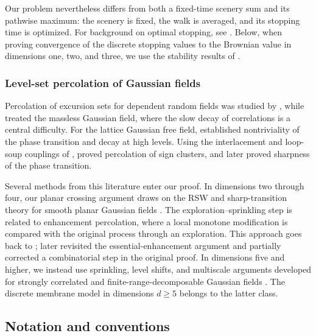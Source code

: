 \documentclass[11pt]{amsart}
\theoremstyle{plain}
\theoremstyle{definition}
\begin{document}
Our problem nevertheless differs from both a fixed-time scenery sum and its
pathwise maximum: the scenery is fixed, the walk is averaged, and its stopping
time is optimized. For background on optimal stopping, see \citet*{PeskirShiryaev}. Below, when proving convergence of
the discrete stopping values to the Brownian value in dimensions one, two, and three, we use the stability results of \citet*[Theorem~3 and Corollary~4]{CoquetToldo}.

\subsubsection{Level-set percolation of Gaussian fields}

Percolation of excursion sets for dependent random fields was studied by
\citet*{MolStepI}, while \citet*{BLM} treated the massless Gaussian field,
where the slow decay of correlations is a central difficulty. For the
lattice Gaussian free field, \citet*{RodSzn} established nontriviality of the
phase transition and decay at high levels. Using the interlacement and
loop-soup couplings of \citet*{Lupu}, \citet*{DPR} proved percolation of sign
clusters, and \citet*{DGRS} later proved sharpness of the phase transition.

Several methods from this literature enter our proof. In dimensions two through four, our planar crossing argument draws on the RSW
and sharp-transition theory for smooth planar Gaussian fields
\citep{BeffaraGayet,MuiVan}. The exploration--sprinkling step is related to enhancement percolation, where a local monotone modification is compared with the original process through an exploration. This approach goes back to
\citet*{AizenmanGrimmett}; \citet*{BalisterBollobasRiordan} later revisited
the essential-enhancement argument and partially corrected a combinatorial
step in the original proof. In dimensions five and higher, we instead use sprinkling, level shifts, and multiscale arguments developed for strongly correlated and finite-range-decomposable Gaussian fields
\citep{Severo,MuiSev,Mui2}. The discrete membrane model in dimensions
$d\geq5$ belongs to the latter class.






\subsection{Notation and conventions}\label{ssec:notation}
\end{document}
